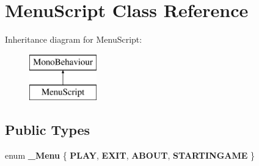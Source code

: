 \hypertarget{class_menu_script}{}\section{Menu\+Script Class Reference}
\label{class_menu_script}
Inheritance diagram for Menu\+Script\+:\begin{figure}[H]
\begin{center}
\leavevmode
\includegraphics[height=2.000000cm]{class_menu_script}
\end{center}
\end{figure}
\subsection*{Public Types}
\begin{DoxyCompactItemize}
\item 
\mbox{\label{class_menu_script_abcfacec71044638c8ccc3b6e04cc39f8}} 
enum {\bfseries \+\_\+\+Menu} \{ {\bfseries P\+L\+AY}, 
{\bfseries E\+X\+IT}, 
{\bfseries A\+B\+O\+UT}, 
{\bfseries S\+T\+A\+R\+T\+I\+N\+G\+A\+ME}
 \}
\end{DoxyCompactItemize}
